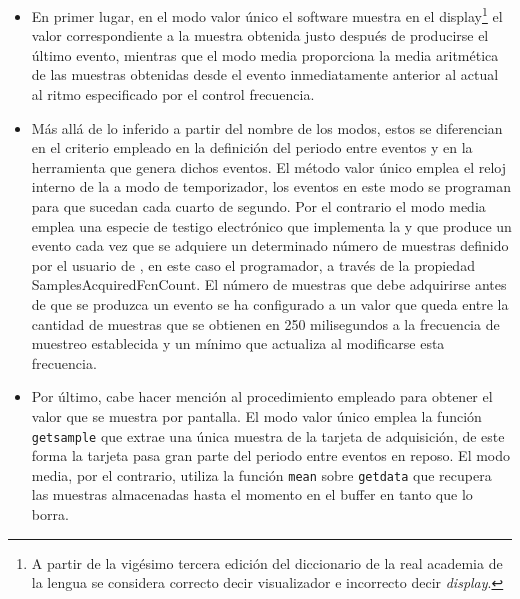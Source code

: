 \begin{itemize}
	\item En primer lugar, en el modo valor único el software muestra en el display\footnote{A partir de la vigésimo tercera edición del diccionario de la real academia de la lengua se considera correcto decir visualizador e incorrecto decir \emph{display}.} el valor correspondiente a la muestra obtenida justo después de producirse el último evento, mientras que el modo media proporciona la media aritmética de las muestras obtenidas desde el evento inmediatamente anterior al actual al ritmo especificado por el control \textsf{frecuencia}.
	\item Más allá de lo inferido a partir del nombre de los modos, estos se diferencian en el criterio empleado en la definición del periodo entre eventos y en la herramienta que genera dichos eventos. El método valor único emplea el reloj interno de la \kpci{} a modo de temporizador, los eventos en este modo se programan para que sucedan cada cuarto de segundo. Por el contrario el modo media emplea una especie de testigo electrónico que implementa la \datx{} y que produce un evento cada vez que se adquiere un determinado número de muestras definido por el usuario de \matlab{}, en este caso el programador, a través de la propiedad \textsf{SamplesAcquiredFcnCount}. El número de muestras que debe adquirirse antes de que se produzca un evento se ha configurado a un valor que queda entre la cantidad de muestras que se obtienen en 250 milisegundos a la frecuencia de muestreo establecida y un mínimo que \matlab{} actualiza al modificarse esta frecuencia.
	\item Por último, cabe hacer mención al procedimiento empleado para obtener el valor que se muestra por pantalla. El modo valor único emplea la función \texttt{getsample} que extrae una única muestra de la tarjeta de adquisición, de este forma la tarjeta pasa gran parte del periodo entre eventos en reposo. El modo media, por el contrario, utiliza la función \texttt{mean} sobre \texttt{getdata} que recupera las muestras almacenadas hasta el momento en el buffer en tanto que lo borra.
\end{itemize}


